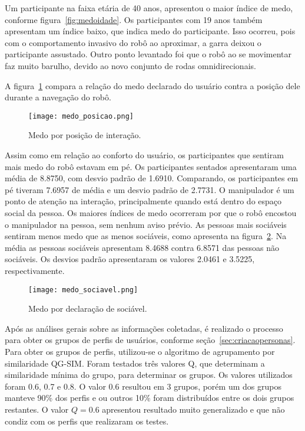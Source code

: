 Um participante na faixa etária de 40 anos, apresentou o maior índice de medo, conforme figura~\ref{fig:medoidade}. Os participantes com 19 anos também apresentam um índice baixo, que indica medo do participante. Isso ocorreu, pois com o comportamento invasivo do robô ao aproximar, a garra deixou o participante assustado. Outro ponto levantado foi que o robô ao se movimentar faz muito barulho, devido ao novo conjunto de rodas omnidirecionais.

A figura~\ref{fig:medoposicao} compara a relação do medo declarado do usuário contra a posição dele durante a navegação do robô.

\begin{figure}[ht!]
	\centering
	\begin{minipage}{0.65\textwidth}
		\caption{Medo por posição de interação.}
		\texttt{[image: medo\_posicao.png]}
		\label{fig:medoposicao}
	\end{minipage}
\end{figure}

Assim como em relação ao conforto do usuário, os participantes que sentiram mais medo do robô estavam em pé. Os participantes sentados apresentaram uma média de 8.8750, com desvio padrão de 1.6910. Comparando, os participantes em pé tiveram 7.6957 de média e um desvio padrão de 2.7731. O manipulador é um ponto de atenção na interação, principalmente quando está dentro do espaço social da pessoa. Os maiores índices de medo ocorreram por que o robô encostou o manipulador na pessoa, sem nenhum aviso prévio. As pessoas mais sociáveis sentiram menos medo que as menos sociáveis, como apresenta na figura~\ref{fig:medosociavel}. Na média as pessoas sociáveis apresentam 8.4688 contra 6.8571 das pessoas não sociáveis. Os desvios padrão apresentaram os valores 2.0461 e 3.5225, respectivamente.

\begin{figure}[ht!]
	\centering
	\begin{minipage}{0.65\textwidth}
		\caption{Medo por declaração de sociável.}
		\texttt{[image: medo\_sociavel.png]}
		\label{fig:medosociavel}
	\end{minipage}
\end{figure}

Após as análises gerais sobre as informações coletadas, é realizado o processo para obter os grupos de perfis de usuários, conforme seção~\ref{sec:criacaopersonas}. Para obter os grupos de perfis, utilizou-se o algoritmo de agrupamento por similaridade QG-SIM. Foram testados três valores Q, que determinam a similaridade mínima do grupo, para determinar os grupos. Os valores utilizados foram 0.6, 0.7 e 0.8. O valor 0.6 resultou em 3 grupos, porém um dos grupos manteve 90\% dos perfis e ou outros 10\% foram distribuídos entre os dois grupos restantes. O valor $Q = 0.6$ apresentou resultado muito generalizado e que não condiz com os perfis que realizaram os testes.

